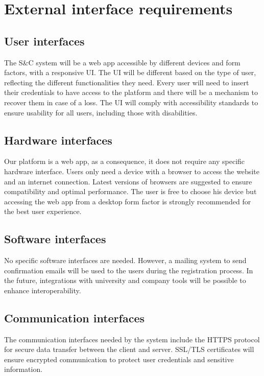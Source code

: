 \section{External interface requirements}
\label{sec:external_interface_requirements}%

\subsection{User interfaces}
\label{subsec:User_interfaces}%
The S\&C system will be a web app accessible by different devices and form factors, with a responsive UI. The UI will be different based on the type of user, reflecting the different functionalities they need. Every user will need to insert their credentials to have access to the platform and there will be a mechanism to recover them in case of a loss. The UI will comply with accessibility standards to ensure usability for all users, including those with disabilities.

\subsection{Hardware interfaces}
\label{subsec:hardware_interfaces}%
Our platform is a web app, as a consequence, it does not require any specific hardware
interface. Users only need a device with a browser to access the website and an internet connection. Latest versions of browsers are suggested to ensure compatibility and optimal performance. The user is free to choose his device but accessing the web app from a desktop form factor is strongly recommended for the best user experience.


\subsection{Software interfaces}
\label{subsec:software_interfaces}%
No specific software interfaces are needed. However, a mailing system to send confirmation emails will be used to the users during the registration process. In the future, integrations with university and company tools will be possible to enhance interoperability.

\subsection{Communication interfaces}
\label{subsec:communication_interfaces}%
The communication interfaces needed by the system include the HTTPS protocol for secure data transfer between the client and server. SSL/TLS certificates will ensure encrypted communication to protect user credentials and sensitive information.

